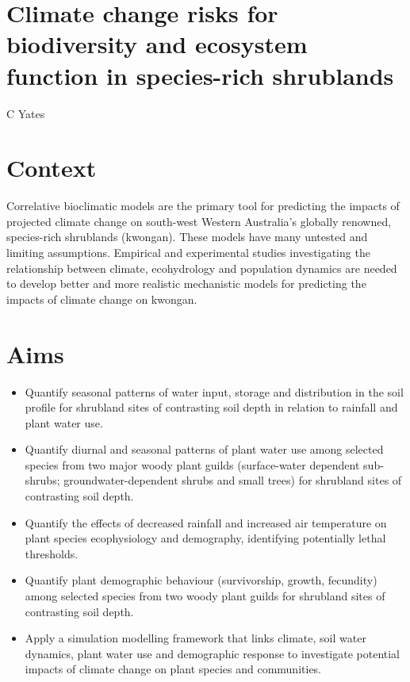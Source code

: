 \documentclass[version=last,
    paper=a4, %
    10pt, %
    usenames,
    dvipsnames,
    oneside, %
    headings=openany, %
    DIV=15 %
]{scrbook}
\begin{document}
\section*{Climate change risks for biodiversity and ecosystem function in
species-rich shrublands
}

C Yates


\section*{Context}
Correlative bioclimatic models are the primary tool for predicting the
impacts of projected climate change on south-west Western Australia's
globally renowned, species-rich shrublands (kwongan). These models have
many untested and limiting assumptions. Empirical and experimental
studies investigating the relationship between climate, ecohydrology and
population dynamics are needed to develop better and more realistic
mechanistic models for predicting the impacts of climate change on
kwongan.



\section*{Aims}
\begin{itemize}
\itemsep1pt\parskip0pt
\item
  Quantify seasonal patterns of water input, storage and distribution in
  the soil profile for shrubland sites of contrasting soil depth in
  relation to rainfall and plant water use.
\item
  Quantify diurnal and seasonal patterns of plant water use among
  selected species from two major woody plant guilds (surface-water
  dependent sub-shrubs; groundwater-dependent shrubs and small trees)
  for shrubland sites of contrasting soil depth.
\item
  Quantify the effects of decreased rainfall and increased air
  temperature on plant species ecophysiology and demography, identifying
  potentially lethal thresholds.
\item
  Quantify plant demographic behaviour (survivorship, growth, fecundity)
  among selected species from two woody plant guilds for shrubland sites
  of contrasting soil depth.
\item
  Apply a simulation modelling framework that links climate, soil water
  dynamics, plant water use and demographic response to investigate
  potential impacts of climate change on plant species and communities.
\end{itemize}
\end{document}
